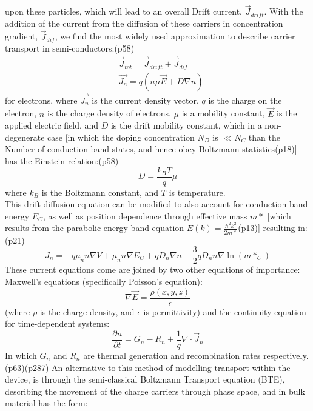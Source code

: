 \documentclass[titlepage]{article}
\begin{document}
upon these particles, which will lead to an overall Drift current, $\vec{J}_{drift}$. With the addition of the current from the diffusion of these carriers in concentration gradient, $\vec{J}_{dif}$, we find the most widely used approximation to describe carrier transport in semi-conductors:\cite{SzeHiSpeed}(p58)
\begin{eqnarray}
&\vec{J}_{tot} = \vec{J}_{drift} + \vec{J}_{dif}\\
&\vec{J_n} = q(n\mu\vec{E} + D\nabla n)
\end{eqnarray}
for electrons, where $\vec{J_n}$ is the current density vector, $q$ is the charge on the electron, $n$ is the charge density of electrons, $\mu$ is a mobility constant, $\vec{E}$ is the applied electric field, and $D$ is the drift mobility constant, which in a non-degenerate case [in which the doping concentration $N_D$ is $\ll N_C$ than the Number of conduction band states, and hence obey Boltzmann statistics\cite{Sze}(p18)] has the Einstein relation:\cite{SzeHiSpeed}(p58)
\begin{equation}
D = \frac{k_B T}{q}\mu
\end{equation}
where $k_B$ is the Boltzmann constant, and $T$ is temperature. \\
This drift-diffusion equation can be modified to also account for conduction band energy $E_C$, as well as position dependence through effective mass $m*$ [which results from the parabolic energy-band equation $E(k) = \frac{\hbar^2k^2}{2m*}$\cite{Sze}(p13)] resulting in:\cite{Frensley}(p21)
\begin{equation}
J_n = -q\mu_n n \nabla V + \mu_n n \nabla E_C + q D_n \nabla n - \frac{3}{2}qD_n n \nabla \ln(m*_C)
\end{equation}
These current equations come are joined by two other equations of importance: Maxwell's equations (specifically Poisson's equation):
\begin{equation}
\nabla \vec{E} = \frac{\rho(x,y,z)}{\epsilon}
\end{equation}
(where $\rho$ is the charge density, and $\epsilon$ is permittivity) and the continuity equation for time-dependent systems:
\begin{equation}
\dfrac{\partial n}{\partial t} = G_n - R_n + \frac{1}{q}\nabla\cdot\vec{J}_n
\end{equation}
In which $G_n$ and $R_n$ are thermal generation and recombination rates respectively.\cite{Sze}(p63)\cite{NSD}(p287)
\medskip
An alternative to this method of modelling transport within the device, is through the semi-classical Boltzmann Transport equation (BTE), describing the movement of the charge carriers through phase space, and in bulk material has the form:
\end{document}
